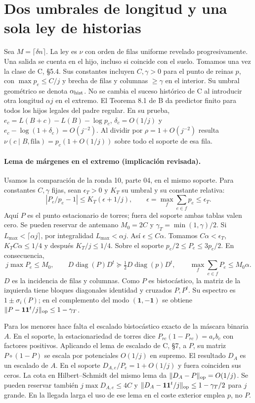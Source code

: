\section{Dos umbrales de longitud y una sola ley de historias}
Sea $M=\lceil\delta n\rceil$. La ley es $\nu$ con orden de filas uniforme revelado
progresivamente. Una salida se cuenta en el hijo, incluso si coincide con el suelo.
Tomamos una vez la clase de C, \S5.4. Sus constantes incluyen $C,\gamma>0$
para el punto de reinas $p$, con $\max p_e\le C/j$ y brecha de filas y columnas
$\ge\gamma$ en el interior. Su umbral geométrico se denota $\alpha_{\rm hist}$.
No se cambia el suceso histórico de C al introducir otra longitud $\alpha j$ en el extremo.
El Teorema 8.1 de B da predictor finito para todos los hijos legales del padre regular.
En su prueba, $e_c=L(B+c)-L(B)-\log p_c$, $\delta_c=O(1/j)$ y
$e_c-\log(1+\delta_c)=O(j^{-2})$. Al dividir por $\rho=1+O(j^{-2})$ resulta
$\nu(c\mid B,\text{fila})=p_c(1+O(1/j))$ sobre todo el soporte de esa fila.

\paragraph{Lema de márgenes en el extremo (implicación revisada).}
Usamos la comparación de la ronda 10, parte 04, en el mismo soporte. Para constantes
$C,\gamma$ fijas, sean $\epsilon_T>0$ y $K_T$ su umbral y su constante relativa:
\[
 \left|P_e/p_e-1\right|\le K_T(\epsilon+1/j),\qquad
 \epsilon=\max_f\sum_{e\in f}p_e\le\epsilon_T .
\]
Aquí $P$ es el punto estacionario de torres; fuera del soporte ambas tablas valen cero.
Se pueden reservar de antemano $M_0=2C$ y $\gamma_T=\min(1,\gamma)/2$.
Si $L_{\max}<\lceil\alpha j\rceil$, por integralidad $L_{\max}<\alpha j$.
Así $\epsilon\le C\alpha$. Tomamos $C\alpha<\epsilon_T$, $K_TC\alpha\le1/4$
y después $K_T/j\le1/4$. Sobre el soporte $p_e/2\le P_e\le3p_e/2$. En consecuencia,
\[
 j\max P_e\le M_0,\qquad
 D\operatorname{diag}(P)D^t\succeq\tfrac12D\operatorname{diag}(p)D^t ,
 \qquad \max_f\sum_{e\in f}P_e\le M_0\alpha .
\]
$D$ es la incidencia de filas y columnas. Como $P$ es bistocástico, la matriz de
la izquierda tiene bloques diagonales identidad y cruzados $P,P^t$. Su espectro es
$1\pm\sigma_i(P)$; en el complemento del modo $(\mathbf1,-\mathbf1)$ se obtiene
$\|P-\mathbf1\mathbf1^t/j\|_{\rm op}\le1-\gamma_T$.

Para los menores hace falta el escalado bistocástico exacto de la máscara binaria $A$.
En el soporte, la estacionariedad de torres dice $P_{rc}(1-P_{rc})=a_r b_c$ con
factores positivos. Aplicando el lema de escalado de C, \S7, a $P$, su matriz
$P\circ(1-P)$ se escala por potenciales $O(1/j)$ en supremo. El resultado $D_A$
es un escalado de $A$. En el soporte $D_{A,e}/P_e=1+O(1/j)$ y fuera coinciden sus ceros.
La cota en Hilbert--Schmidt del mismo lema da $\|D_A-P\|_{\rm op}=O(1/j)$.
Se pueden reservar también $j\max D_{A,e}\le4C$ y
$\|D_A-\mathbf1\mathbf1^t/j\|_{\rm op}\le1-\gamma_T/2$ para $j$ grande.
En la llegada larga el uso de ese lema en el coste exterior emplea $p$, no $P$.

